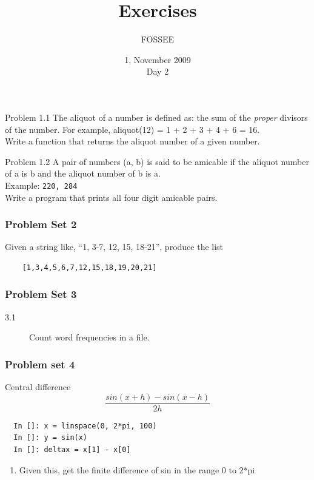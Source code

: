 \documentclass[14pt,compress]{beamer}
\title[Exercises]{Exercises}
\author[FOSSEE] {FOSSEE}
\institute[IIT Bombay] {Department of Aerospace Engineering\\IIT Bombay}
\date[] {1, November 2009\\Day 2}
\newcounter{time}
\newcommand{\inctime}[1]{\addtocounter{time}{#1}{\tiny \thetime\ m}}
\begin{document}
\begin{frame}
  \titlepage
\end{frame}

\begin{frame}{Problem 1.1}
  The aliquot of a number is defined as: the sum of the \emph{proper} divisors of the number. For example, aliquot(12) = 1 + 2 + 3 + 4 + 6 = 16.\\
  Write a function that returns the aliquot number of a given number. 
\end{frame}

\begin{frame}{Problem 1.2}
  A pair of numbers (a, b) is said to be \alert{amicable} if the aliquot number of a is b and the aliquot number of b is a.\\
  Example: \texttt{220, 284}\\
  Write a program that prints all four digit amicable pairs.
  
\inctime{20}
\end{frame}



\begin{frame}[fragile]
  \frametitle{Problem Set 2}
  Given a string like, ``1, 3-7, 12, 15, 18-21'', produce the list \\
  \begin{lstlisting}
    [1,3,4,5,6,7,12,15,18,19,20,21]
  \end{lstlisting}
\inctime{10}
\end{frame}

\begin{frame} 
  \frametitle{Problem Set 3}
  \begin{description}
    \item[3.1] Count word frequencies in a file.
\end{description}
\inctime{5}
\end{frame}

\begin{frame}[fragile]
  \frametitle{Problem set 4}
  Central difference
  \begin{equation*}
  \frac{sin(x+h)-sin(x-h)}{2h}
  \end{equation*}
  \begin{lstlisting}
  In []: x = linspace(0, 2*pi, 100)
  In []: y = sin(x)
  In []: deltax = x[1] - x[0]
  \end{lstlisting}
  \pause
    \begin{enumerate}
      \item Given this, get the finite difference of sin in the range 0 to 2*pi
    \end{enumerate}
\end{frame}
\end{document}
